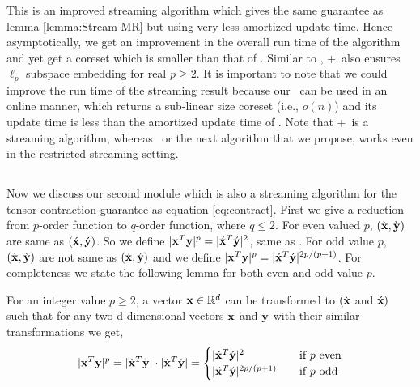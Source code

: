 % 
This is an improved streaming algorithm which gives the same guarantee as lemma \ref{lemma:Stream-MR} but using very less amortized update time. Hence asymptotically, we get an improvement in the overall run time of the algorithm and yet get a coreset which is smaller than that of \online. Similar to \mrlw, \online+\mrlw~also ensures $\ell_{p}$ subspace embedding for real $p \geq 2$.
It is important to note that we could improve the run time of the streaming result because our \online~can be used in an online manner, which returns a sub-linear size coreset (i.e., $o(n)$) and its update time is less than the amortized update time of \mrlw.
Note that \online+\mrlw~is a streaming algorithm, whereas \online~or the next algorithm that we propose, works even in the restricted streaming setting. 
% 
\subsection{}
Now we discuss our second module which is also a streaming algorithm for the tensor contraction guarantee as equation \eqref{eq:contract}. First we give a reduction from $p$-order function to $q$-order function, where $q \leq 2$. For even valued $p$, $(\grave{\mathbf{x}},\grave{\mathbf{y}})$ are same as $(\acute{\mathbf{x}},\acute{\mathbf{y}})$. So we define $|\mathbf{x}^{T}\mathbf{y}|^{p} = |\acute{\mathbf{x}}^{T}\acute{\mathbf{y}}|^{2}$, same as \cite{schechtman2011tight}. For odd value $p$, $(\grave{\mathbf{x}},\grave{\mathbf{y}})$ are not same as $(\acute{\mathbf{x}},\acute{\mathbf{y}})$ and we define $|\mathbf{x}^{T}\mathbf{y}|^{p} = |\acute{\mathbf{x}}^{T}\acute{\mathbf{y}}|^{2p/(p+1)}$. For completeness we state the following lemma for both even and odd value $p$.
% 
\begin{lemma}{\label{lemma:kernel}}
 For an integer value $p \geq 2$, a vector $\mathbf{x} \in \mathbb{R}^{d}$ can be transformed to $(\grave{\mathbf{x}}$ and $\acute{\mathbf{x}})$ such that for any two d-dimensional vectors $\mathbf{x}$ and $\mathbf{y}$ with their similar transformations we get,
 \[|\*x^{T}\*y|^{p} = |\grave{\*x}^{T}\grave{\*y}|\cdot|\acute{\*x}^{T}\acute{\*y}| = 
 \begin{cases}
  |\acute{\*x}^{T}\acute{\*y}|^{2}  & \quad \text{if } p \mbox{ even}\\
  |\acute{\*x}^{T}\acute{\*y}|^{2p/(p+1)}  & \quad \text{if } p\ \mbox{odd}\\
  \end{cases}\]
\end{lemma}
% 
